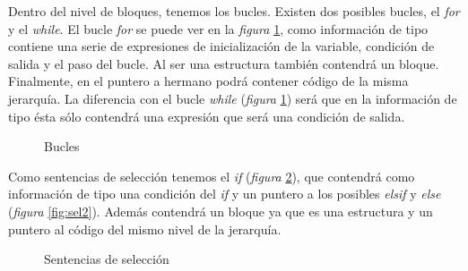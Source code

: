 \documentclass[a4paper,10pt]{article}
\begin{document}
Dentro del nivel de bloques, tenemos los bucles. Existen dos posibles bucles, el \textit{for} y el \textit{while}. El bucle \textit{for} se puede ver en la \emph{figura} \ref{fig:bucles}, como información de tipo contiene una serie de expresiones de inicialización de la variable, condición de salida y el paso del bucle. Al ser una estructura también contendrá un bloque. Finalmente, en el puntero a hermano podrá contener código de la misma jerarquía. La diferencia con el bucle \textit{while} (\emph{figura} \ref{fig:bucles}) será que en la información de tipo ésta sólo contendrá una expresión que será una condición de salida.
\begin{figure}[H]
  \centering
  \hspace{11mm}
  \caption{Bucles}
  \label{fig:bucles}
\end{figure}

Como sentencias de selección tenemos el \textit{if} (\emph{figura} \ref{fig:sel1}), que contendrá como información de tipo una condición del \textit{if} y un puntero a los posibles \textit{elsif} y \textit{else} (\emph{figura} \ref{fig:sel2}). Además contendrá un bloque ya que es una estructura y un puntero al código del mismo nivel de la jerarquía.
\begin{figure}[H]
  \centering
  \hspace{11mm}
  \caption{Sentencias de selección}
  \label{fig:sel1}
\end{figure}
\end{document}
